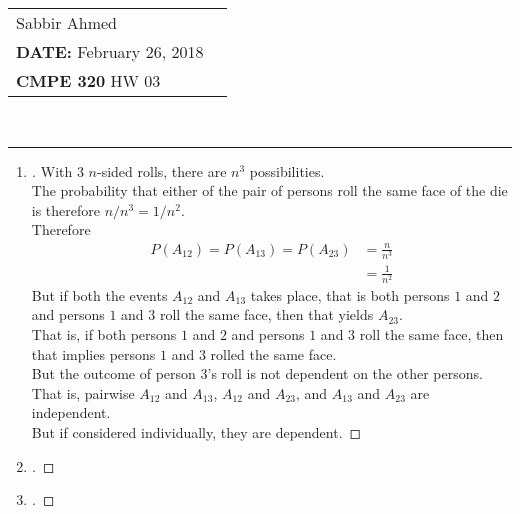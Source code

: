 \documentclass[paper=usletter, fontsize=12pt]{article}
\newcommand{\documentinfo}[5]{
    \begin{centering}
        \parbox{2in}{
        \begin{spacing}{1}
            \begin{flushleft}
                \begin{tabular}{l l}
                    #1 \\
                    #2 \\
                    #3 \\
                \end{tabular}\\
                \rule{\textwidth}{1pt}
            \end{flushleft}
        \end{spacing}
        }
    \end{centering}
}
\begin{document}
    \documentinfo{Sabbir Ahmed}{\textbf{DATE:} February 26, 2018}{\textbf{CMPE 320} HW 03}
    \vspace{-0.2in}

    \begin{enumerate}

        \item
        \begin{proof}[\unskip\nopunct]
            With 3 $n$-sided rolls, there are $n^3$ possibilities. \\
            The probability that either of the pair of persons roll the same
            face of the die is therefore $n/n^3=1/n^2$. \\
            Therefore
            \begin{align*}
                P(A_{12}) = P(A_{13}) = P(A_{23}) & = \frac{n}{n^3} \\
                & = \frac{1}{n^2}
            \end{align*}
            But if both the events $A_{12}$ and $A_{13}$ takes place, that is
            both persons $1$ and $2$ and persons $1$ and $3$ roll the same
            face, then that yields $A_{23}$. \\
            That is, if both persons $1$ and $2$ and persons $1$ and $3$ roll
            the same face, then that implies persons $1$ and $3$ rolled the
            same face.\\
            But the outcome of person $3$'s roll is not dependent on the other
            persons.\\
            That is, pairwise $A_{12}$ and $A_{13}$, $A_{12}$ and $A_{23}$, and
            $A_{13}$ and $A_{23}$ are independent.\\
            But if considered individually, they are dependent. \qedhere
        \end{proof}
        \vspace{0.2in}

        \item
        \begin{proof}[\unskip\nopunct]
        \end{proof}
        \vspace{0.2in}

        \item
        \begin{proof}[\unskip\nopunct]
        \end{proof}
        \vspace{0.2in}


\end{enumerate}
\end{document}
